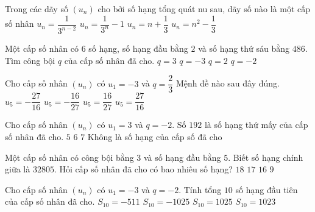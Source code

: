 \begin{ex}%
	Trong các dãy số $(u_n)$ cho bởi số hạng tổng quát nu sau, dãy số nào là một cấp số nhân
	\choice
	{\True
		$u_n=\dfrac{1}{3^{n-2}}$}
	{$u_n=\dfrac{1}{3^{n}}-1$}
	{$u_n=n+\dfrac{1}{3}$}
	{$u_n=n^2-\dfrac{1}{3}$}
\end{ex}
\begin{ex}%
	Một cấp số nhân có $6$ số hạng, số hạng đầu bằng $2$ và số hạng thứ sáu bằng $486$. Tìm công bội $q$ của cấp số nhân đã cho.
	\choice
	{\True $q=3$}
	{$q=-3$}
	{$q=2$}
	{$q=-2$}
\end{ex}
\begin{ex}%
	Cho cấp số nhân $\left(u_n\right)$ có $u_1=-3$ và $q=\dfrac{2}{3}$ Mệnh đề nào sau đây đúng.
	\choice
	{$u_5=-\dfrac{27}{16}$}
	{\True $u_5=-\dfrac{16}{27}$}
	{$u_5=\dfrac{16}{27}$}
	{$u_5=\dfrac{27}{16}$}
\end{ex}
\begin{ex}%
	Cho cấp số nhân $\left(u_n\right)$ có $u_1=3$ và $q=-2$. Số $192$ là số hạng thứ mấy của cấp số nhân đã cho.
	\choice
	{$5$}
	{$6$}
	{\True $7$}
	{Không là số hạng của cấp số đã cho}
\end{ex}
\begin{ex}%
	Một cấp số nhân có công bội bằng $3$ và số hạng đầu bằng $5$. Biết số hạng chính giữa là $32805$. Hỏi cấp số nhân đã cho có bao nhiêu số hạng?
	\choice
	{$18$}
	{\True $17$}
	{$16$}
	{$9$}
\end{ex}
\begin{ex}%
	Cho cấp số nhân $\left(u_n\right)$ có $u_1=-3$ và $q=-2$. Tính tổng $10$ số hạng đầu tiên của cấp số nhân đã cho.
	\choice
	{$S_{10}=-511$}
	{$S_{10}=-1025$}
	{$S_{10}=1025$}
	{\True $S_{10}=1023$}
\end{ex}

